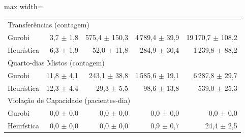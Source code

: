 \begin{table}[htbp]
\begin{adjustbox}{max width=\textwidth}
\begin{tabular}{lrrrr}
        \multicolumn{5}{l}{Transferências (contagem)} \\
        \quad Gurobi & 3,7 $\pm$ 1,8 & 575,4 $\pm$ 150,3 & 4\,789,4 $\pm$ 39,9 & 19\,170,7 $\pm$ 108,2 \\
        \quad Heurística & 6,3 $\pm$ 1,9 & 52,0 $\pm$ 11,8 & 284,9 $\pm$ 30,4 & 1\,239,8 $\pm$ 88,2 \\
        \multicolumn{5}{l}{Quarto-dias Mistos (contagem)} \\
        \quad Gurobi & 11,8 $\pm$ 4,1 & 243,1 $\pm$ 38,8 & 1\,585,6 $\pm$ 19,1 & 6\,287,8 $\pm$ 29,7 \\
        \quad Heurística & 12,3 $\pm$ 4,4 & 29,3 $\pm$ 5,5 & 98,6 $\pm$ 13,8 & 539,0 $\pm$ 25,3 \\
        \multicolumn{5}{l}{Violação de Capacidade (pacientes-dia)} \\
        \quad Gurobi & 0,0 $\pm$ 0,0 & 0,0 $\pm$ 0,0 & 0,0 $\pm$ 0,0 & 0,0 $\pm$ 0,0 \\
        \quad Heurística & 0,0 $\pm$ 0,0 & 0,0 $\pm$ 0,0 & 0,9 $\pm$ 0,7 & 24,4 $\pm$ 2,5 \\
        \hline
    \end{tabular}
    \end{adjustbox}
\end{table}
